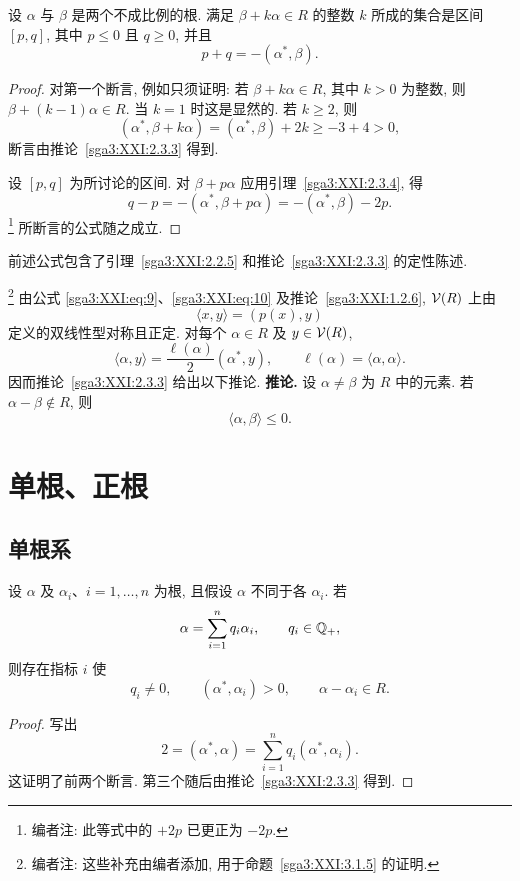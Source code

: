 \begin{proposition}\label{sga3:XXI:2.3.5}
设 \(\alpha\) 与 \(\beta\) 是两个不成比例的根. 满足 \(\beta+k\alpha\in R\) 的整数 \(k\) 所成的集合是区间 \([p,q]\), 其中 \(p\leq0\) 且 \(q\geq0\), 并且
\[
 p+q=-(\alpha^\ast,\beta).
\]
\end{proposition}
\begin{proof}
对第一个断言, 例如只须证明: 若 \(\beta+k\alpha\in R\), 其中 \(k>0\) 为整数, 则 \(\beta+(k-1)\alpha\in R\). 当 \(k=1\) 时这是显然的. 若 \(k\geq2\), 则
\[
 (\alpha^\ast,\beta+k\alpha)
 =(\alpha^\ast,\beta)+2k\geq-3+4>0,
\]
断言由推论~\ref{sga3:XXI:2.3.3} 得到.

设 \([p,q]\) 为所讨论的区间. 对 \(\beta+p\alpha\) 应用引理~\ref{sga3:XXI:2.3.4}, 得
\[
 q-p
 =-(\alpha^\ast,\beta+p\alpha)
 =-(\alpha^\ast,\beta)-2p.
\]
\footnote{编者注: 此等式中的 \(+2p\) 已更正为 \(-2p\).}
所断言的公式随之成立.
\end{proof}

\begin{remark}\label{sga3:XXI:2.3.6}
前述公式包含了引理~\ref{sga3:XXI:2.2.5} 和推论~\ref{sga3:XXI:2.3.3} 的定性陈述.
\end{remark}

\begin{complements}\label{sga3:XXI:2.3.7}
\footnote{编者注: 这些补充由编者添加, 用于命题~\ref{sga3:XXI:3.1.5} 的证明.}
由公式 \eqref{sga3:XXI:eq:9}、\eqref{sga3:XXI:eq:10} 及推论~\ref{sga3:XXI:1.2.6}, \(\mathcal{V}(R)\) 上由
\[
 \langle x,y\rangle=(p(x),y)
\]
定义的双线性型对称且正定. 对每个 \(\alpha\in R\) 及 \(y\in\mathcal{V}(R)\),
\[
 \langle\alpha,y\rangle
 =\frac{\ell(\alpha)}2(\alpha^\ast,y),
 \qquad
 \ell(\alpha)=\langle\alpha,\alpha\rangle.
\]
因而推论~\ref{sga3:XXI:2.3.3} 给出以下推论.
\medskip
\noindent\textbf{推论.}\quad
{}
设 \(\alpha\neq\beta\) 为 \(R\) 中的元素. 若 \(\alpha-\beta\notin R\), 则
\[
 \langle\alpha,\beta\rangle\leq0.
\]
\end{complements}

\section{单根、正根}
\subsection{单根系}
\begin{lemma}\label{sga3:XXI:3.1.1}
设 \(\alpha\) 及 \(\alpha_i\)、\(i=1,\ldots,n\) 为根, 且假设 \(\alpha\) 不同于各 \(\alpha_i\). 若
\[
 \alpha=\sum_{i=1}^n q_i\alpha_i,
 \qquad q_i\in\mathbb{Q}_{+},
\]
则存在指标 \(i\) 使
\[
 q_i\neq0,\qquad(\alpha^\ast,\alpha_i)>0,\qquad
 \alpha-\alpha_i\in R.
\]
\end{lemma}
\begin{proof}
写出
\[
 2=(\alpha^\ast,\alpha)
   =\sum_{i=1}^n q_i(\alpha^\ast,\alpha_i).
\]
这证明了前两个断言. 第三个随后由推论~\ref{sga3:XXI:2.3.3} 得到.
\end{proof}

